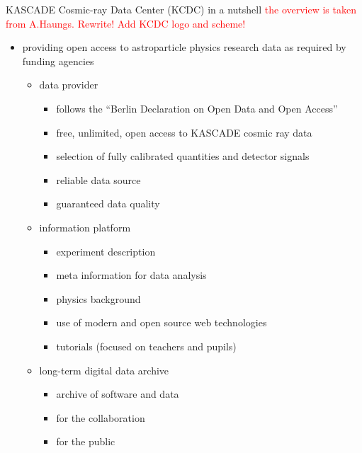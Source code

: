 \begin{frame}{KASCADE Cosmic-ray Data Center (KCDC) in a nutshell}
        \tiny
 \textcolor{red}{the overview is taken from A.Haungs. Rewrite!}
  \textcolor{red}{Add KCDC logo and scheme!}
    \begin{itemize}
             \tiny
        \item providing open access to astroparticle physics research data
        as required by funding agencies
        \begin{itemize}
            \item data provider
            \begin{itemize}
                \item follows the “Berlin Declaration on Open Data and Open Access”
                \item free, unlimited, open access to KASCADE cosmic ray data
                \item selection of fully calibrated quantities and detector signals
                \item reliable data source
                \item guaranteed data quality
            \end{itemize}
            \item information platform
            \begin{itemize}
                \item experiment description
                \item meta information for data analysis
                \item physics background
                \item use of modern and open source web technologies
                \item tutorials (focused on teachers and pupils)
            \end{itemize}
            \item long-term digital data archive
            \begin{itemize}
                \item archive of software and data
                \item for the collaboration
                \item for the public 
            \end{itemize}
        \end{itemize}
    \end{itemize}
\end{frame}

